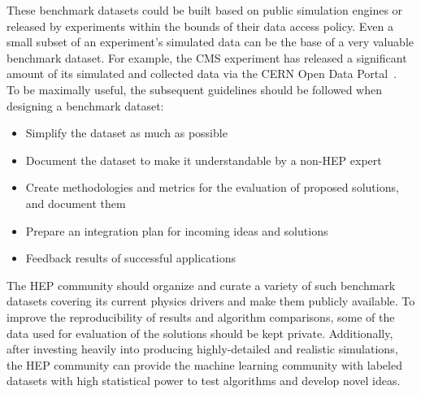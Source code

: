 These benchmark datasets could be built based on public simulation engines or released by experiments within the bounds of their data access policy. Even a small subset of an experiment's simulated data can be the base of a very valuable benchmark dataset. For example, the CMS experiment has released a significant amount of its simulated and collected data via the CERN Open Data Portal~\cite{opendata}.\\

To be maximally useful, the subsequent guidelines should be followed when designing a benchmark dataset:
\begin{itemize}
 \item Simplify the dataset as much as possible
 \item Document the dataset to make it understandable by a non-HEP expert
 \item Create methodologies and metrics for the evaluation of proposed solutions, and document them
 \item Prepare an integration plan for incoming ideas and solutions
 \item Feedback results of successful applications
\end{itemize}



The HEP community should organize and curate a variety of such benchmark datasets covering its current physics drivers and make them publicly available. To improve the reproducibility of results and algorithm comparisons, some of the data used for evaluation of the solutions should be kept private.
Additionally, after investing heavily into producing highly-detailed and realistic simulations, the HEP community can provide the machine learning community with labeled datasets with high statistical power to test algorithms and develop novel ideas.


